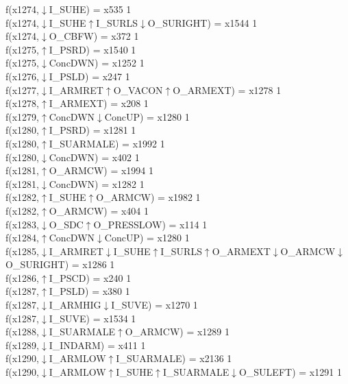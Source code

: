 f(x1274,$\downarrow$I\_SUHE) = x535 {1} \\
f(x1274,$\downarrow$I\_SUHE$\uparrow$I\_SURLS$\downarrow$O\_SURIGHT) = x1544 {1} \\
f(x1274,$\downarrow$O\_CBFW) = x372 {1} \\
f(x1275,$\uparrow$I\_PSRD) = x1540 {1} \\
f(x1275,$\downarrow$ConcDWN) = x1252 {1} \\
f(x1276,$\downarrow$I\_PSLD) = x247 {1} \\
f(x1277,$\downarrow$I\_ARMRET$\uparrow$O\_VACON$\uparrow$O\_ARMEXT) = x1278 {1} \\
f(x1278,$\uparrow$I\_ARMEXT) = x208 {1} \\
f(x1279,$\uparrow$ConcDWN$\downarrow$ConcUP) = x1280 {1} \\
f(x1280,$\uparrow$I\_PSRD) = x1281 {1} \\
f(x1280,$\uparrow$I\_SUARMALE) = x1992 {1} \\
f(x1280,$\downarrow$ConcDWN) = x402 {1} \\
f(x1281,$\uparrow$O\_ARMCW) = x1994 {1} \\
f(x1281,$\downarrow$ConcDWN) = x1282 {1} \\
f(x1282,$\uparrow$I\_SUHE$\uparrow$O\_ARMCW) = x1982 {1} \\
f(x1282,$\uparrow$O\_ARMCW) = x404 {1} \\
f(x1283,$\downarrow$O\_SDC$\uparrow$O\_PRESSLOW) = x114 {1} \\
f(x1284,$\uparrow$ConcDWN$\downarrow$ConcUP) = x1280 {1} \\
f(x1285,$\downarrow$I\_ARMRET$\downarrow$I\_SUHE$\uparrow$I\_SURLS$\uparrow$O\_ARMEXT$\downarrow$O\_ARMCW$\downarrow$O\_SURIGHT) = x1286 {1} \\
f(x1286,$\uparrow$I\_PSCD) = x240 {1} \\
f(x1287,$\uparrow$I\_PSLD) = x380 {1} \\
f(x1287,$\downarrow$I\_ARMHIG$\downarrow$I\_SUVE) = x1270 {1} \\
f(x1287,$\downarrow$I\_SUVE) = x1534 {1} \\
f(x1288,$\downarrow$I\_SUARMALE$\uparrow$O\_ARMCW) = x1289 {1} \\
f(x1289,$\downarrow$I\_INDARM) = x411 {1} \\
f(x1290,$\downarrow$I\_ARMLOW$\uparrow$I\_SUARMALE) = x2136 {1} \\
f(x1290,$\downarrow$I\_ARMLOW$\uparrow$I\_SUHE$\uparrow$I\_SUARMALE$\downarrow$O\_SULEFT) = x1291 {1} \\
